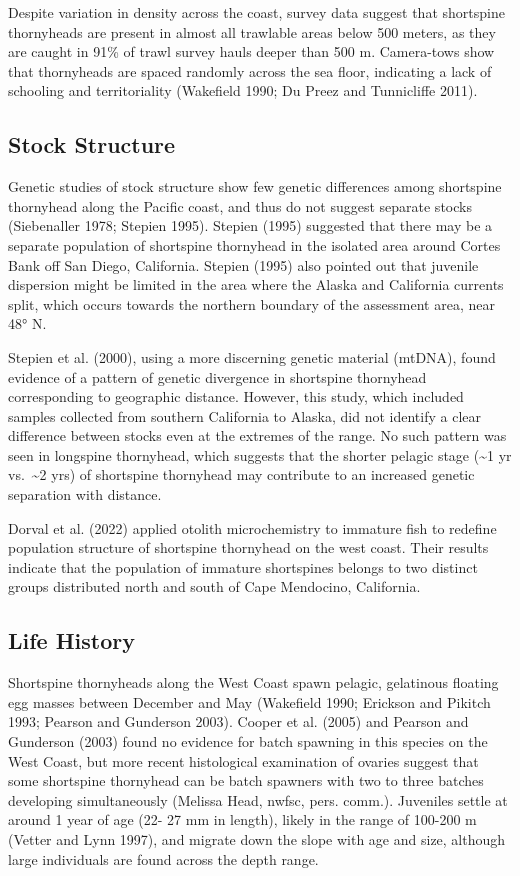 \documentclass[11pt,
  english,
  letterpaper,
]{article}
\begin{document}
Despite variation in density across the coast, survey data suggest that shortspine thornyheads are present in almost all trawlable areas below 500 meters, as they are caught in 91\% of trawl survey hauls deeper than 500 m. Camera-tows show that thornyheads are spaced randomly across the sea floor, indicating a lack of schooling and territoriality (Wakefield 1990; Du Preez and Tunnicliffe 2011).

\hypertarget{stock-structure}{%
\subsection{Stock Structure}\label{stock-structure}}

Genetic studies of stock structure show few genetic differences among shortspine thornyhead along the Pacific coast, and thus do not suggest separate stocks (Siebenaller 1978; Stepien 1995). Stepien (1995) suggested that there may be a separate population of shortspine thornyhead in the isolated area around Cortes Bank off San Diego, California. Stepien (1995) also pointed out that juvenile dispersion might be limited in the area where the Alaska and California currents split, which occurs towards the northern boundary of the assessment area, near 48° N.

Stepien et al. (2000), using a more discerning genetic material (mtDNA), found evidence of a pattern of genetic divergence in shortspine thornyhead corresponding to geographic distance. However, this study, which included samples collected from southern California to Alaska, did not identify a clear difference between stocks even at the extremes of the range. No such pattern was seen in longspine thornyhead, which suggests that the shorter pelagic stage (\textasciitilde1 yr vs.~\textasciitilde2 yrs) of shortspine thornyhead may contribute to an increased genetic separation with distance.

Dorval et al. (2022) applied otolith microchemistry to immature fish to redefine population structure of shortspine thornyhead on the west coast. Their results indicate that the population of immature shortspines belongs to two distinct groups distributed north and south of Cape Mendocino, California.

\hypertarget{life-history}{%
\subsection{Life History}\label{life-history}}

Shortspine thornyheads along the West Coast spawn pelagic, gelatinous floating egg masses between December and May (Wakefield 1990; Erickson and Pikitch 1993; Pearson and Gunderson 2003). Cooper et al. (2005) and Pearson and Gunderson (2003) found no evidence for batch spawning in this species on the West Coast, but more recent histological examination of ovaries suggest that some shortspine thornyhead can be batch spawners with two to three batches developing simultaneously (Melissa Head, \gls{nwfsc}, pers. comm.). Juveniles settle at around 1 year of age (22- 27 mm in length), likely in the range of 100-200 m (Vetter and Lynn 1997), and migrate down the slope with age and size, although large individuals are found across the depth range.
\end{document}
